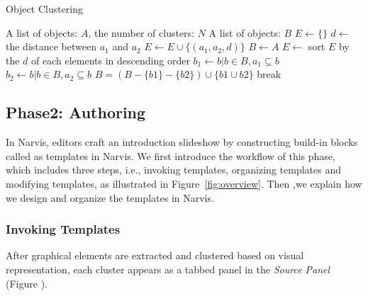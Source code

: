     
    \begin{algorithm}  
        \caption{Object Clustering} 
        \label{alg:alg2} 
        \begin{algorithmic} %
            \Require A list of objects: $A$, the number of clusters: $N$
            \Ensure A list of objects: $B$
            \State $E \gets \{\}$
                 
                        \State $d \gets$ the distance between $a_1$ and $a_2$
                        \State $E \gets E \cup \{(a_1, a_2, d)\}$
                    \EndIf
                \EndFor
            \EndFor
            \State $B \gets A$
            \State $E \gets$ sort $E$ by the $d$ of each elements in descending order
                \State $b_1 \gets b|b\in B, a_1 \subseteq b$
                \State $b_2 \gets b|b\in B, a_2 \subseteq b$
                    \State $B = (B - \{b1\} - \{b2\})\cup \{b1 \cup b2\}$
                \EndIf
                    \State break
                \EndIf
            \EndFor
            \State {}
        \end{algorithmic}  
    \end{algorithm} 

\subsection{Phase2: Authoring}
In Narvis, editors craft an introduction slideshow by constructing build-in blocks called as templates in Narvis. We first introduce the workflow of this phase, which includes three steps, i.e., invoking templates, organizing templates and modifying templates, as illustrated in Figure~\ref{fig:overview}. Then ,we explain how we design and organize the templates in Narvis. 

\subsubsection{Invoking Templates} 

After graphical elements are extracted and clustered based on visual representation, each cluster appears as a tabbed panel in the \textit{Source Panel} (Figure ). 

